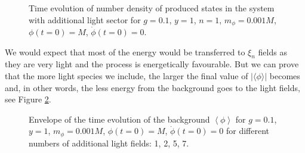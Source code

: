 \documentclass[twocolumn,showpacs,preprintnumbers,amsmath,amssymb,nofootinbib,superscriptaddress,prc]{revtex4}
\begin{document}
\begin{figure}[h!]
 \begin{center}
   \caption{Time evolution of number density of produced states in the system with additional light sector for $g=0.1$, $y=1$, $n=1$, $m_\phi=0.001 M$, $\phi(t=0)=M$, $\dot{\phi}(t=0)=0$. }
  \label{fig:quench}
  \end{center}
\end{figure}

We would expect that most of the energy would be transferred to $\xi_n$ fields as they are very light and the process is energetically favourable. But we can prove that the more light species we include, the larger the final value of $| \langle \phi \rangle |$ becomes and, in other words, the less energy from the background goes to the light fields, see Figure \ref{fig:quenchn}. 

\begin{figure}[h!]
 \begin{center}
  \caption{Envelope of the time evolution of the background $\left<\phi\right>$ for $g=0.1$, $y=1$, $m_\phi=0.001 M$, $\phi(t=0)=M$, $\dot{\phi}(t=0)=0$ for different numbers of additional light fields: 1, 2, 5, 7.}
  \label{fig:quenchn}
  \end{center}
\end{figure}
\end{document}
